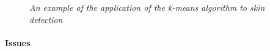 \begin{figure}[H]
    \centering
    \qquad
   \caption{\textit{An example of the application of the k-means algorithm to skin detection}}
   \label{fig:kmeans}
\end{figure}


\paragraph{Issues}
\label{impl:kmeans_bad}


